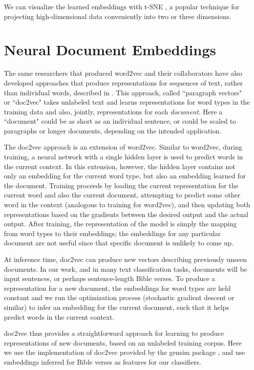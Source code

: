 We can visualize the learned embeddings with t-SNE \cite{van2008visualizing},
a popular technique for projecting high-dimensional data conveniently into two
or three dimensions.

\section{Neural Document Embeddings}
The same researchers that produced word2vec and their collaborators have also
developed approaches that produce representations for sequences of text, rather
than individual words, described in
\cite{dai-document-embedding-2015,quocle-distributed-representations-2014}.
This approach, called ``paragraph vectors" or ``doc2vec" takes unlabeled text
and learns representations for word types in the training data and also,
jointly, representations for each \emph{document}. Here a ``document" could be
as short as an individual sentence, or could be scaled to paragraphs or longer
documents, depending on the intended application.

The doc2vec approach is an extension of word2vec. Similar to word2vec, during
training, a neural network with a single hidden layer is used to predict words
in the current context. In this extension, however, the hidden layer contains
not only an embedding for the current word type, but also an embedding learned
for the document. Training proceeds by loading the current representation for
the current word and also the current document, attempting to predict some
other word in the context (analogous to training for word2vec), and then
updating both representations based on the gradients between the desired output
and the actual output. After training, the representation of the model is
simply the mapping from word types to their embeddings; the embeddings for any
particular document are not useful since that specific document is unlikely to
come up.

At inference time, doc2vec can produce new vectors describing previously unseen
documents. In our work, and in many text classification tasks, documents will
be input sentences, or perhaps sentence-length Bible verses.  To produce a
representation for a new document, the embeddings for word types are held
constant and we run the optimization process (stochastic gradient descent or
similar) to infer an embedding for the current document, such that it helps
predict words in the current context.

doc2vec thus provides a straightforward approach for learning to produce
representations of new documents, based on an unlabeled training corpus.  Here
we use the implementation of doc2vec provided by the gensim package
\cite{rehurek-lrec}, and use embeddings inferred for Bible verses as features
for our classifiers.

